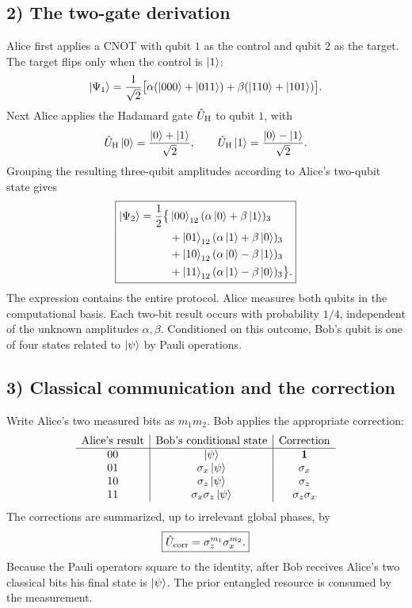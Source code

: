 \subsection*{2) The two-gate derivation}

Alice first applies a CNOT with qubit $1$ as the control and qubit $2$ as the target. The target flips only when the control is $\left|1\right\rangle$:
\begin{equation}
\left|\Psi_1\right\rangle=\frac1{\sqrt2}
  \bigl[\alpha(\left|000\right\rangle+\left|011\right\rangle)
       +\beta(\left|110\right\rangle+\left|101\right\rangle)\bigr].
\end{equation}
Next Alice applies the Hadamard gate $\hat{U}_{\mathrm H}$ to qubit $1$, with
\begin{equation}
\hat{U}_{\mathrm H}\left|0\right\rangle=\frac{\left|0\right\rangle+\left|1\right\rangle}{\sqrt2},\qquad
\hat{U}_{\mathrm H}\left|1\right\rangle=\frac{\left|0\right\rangle-\left|1\right\rangle}{\sqrt2}.
\end{equation}
Grouping the resulting three-qubit amplitudes according to Alice's two-qubit state gives
\begin{equation}
\boxed{\begin{aligned}
\left|\Psi_2\right\rangle=\frac12\bigl\{&\left|00\right\rangle_{12}(\alpha\left|0\right\rangle+\beta\left|1\right\rangle)_3\\
 &+\left|01\right\rangle_{12}(\alpha\left|1\right\rangle+\beta\left|0\right\rangle)_3\\
 &+\left|10\right\rangle_{12}(\alpha\left|0\right\rangle-\beta\left|1\right\rangle)_3\\
 &+\left|11\right\rangle_{12}(\alpha\left|1\right\rangle-\beta\left|0\right\rangle)_3\bigr\}.
\end{aligned}}
\end{equation}
The expression contains the entire protocol. Alice measures both qubits in the computational basis. Each two-bit result occurs with probability $1/4$, independent of the unknown amplitudes $\alpha,\beta$. Conditioned on this outcome, Bob's qubit is one of four states related to $\left|\psi\right\rangle$ by Pauli operations.

\subsection*{3) Classical communication and the correction}

Write Alice's two measured bits as $m_1m_2$. Bob applies the appropriate correction:
\begin{equation}
\begin{array}{c|c|c}
\text{Alice's result}&\text{Bob's conditional state}&\text{Correction}\\\hline
00&\left|\psi\right\rangle&\mathbf1\\
01&\sigma_x\left|\psi\right\rangle&\sigma_x\\
10&\sigma_z\left|\psi\right\rangle&\sigma_z\\
11&\sigma_x\sigma_z\left|\psi\right\rangle&\sigma_z\sigma_x
\end{array}
\end{equation}
The corrections are summarized, up to irrelevant global phases, by
\begin{equation}
\boxed{\hat{U}_{\mathrm{corr}}=\sigma_z^{m_1}\sigma_x^{m_2}.}
\end{equation}
Because the Pauli operators square to the identity, after Bob receives Alice's two classical bits his final state is $\left|\psi\right\rangle$. The prior entangled resource is consumed by the measurement.

